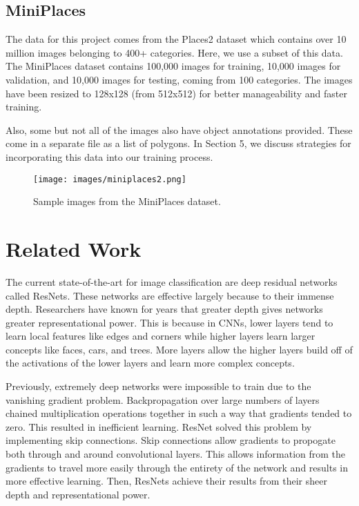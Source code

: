 \documentclass[10pt,twocolumn,letterpaper]{article}
\begin{document}
\subsection{MiniPlaces}

The data for this project comes from the Places2\cite{places} dataset which contains over 10 million images belonging to 400+ categories. Here, we use a subset of this data. The MiniPlaces dataset contains 100,000 images for training, 10,000 images for validation, and 10,000 images for testing, coming from 100 categories. The images have been resized to 128x128 (from 512x512) for better manageability and faster training. 

Also, some but not all of the images also have object annotations provided. These come in a separate file as a list of polygons. In Section 5, we discuss strategies for incorporating this data into our training process.

\begin{figure}[t]
\begin{center}
\texttt{[image: images/miniplaces2.png]}
\end{center}
   \caption{Sample images from the MiniPlaces dataset.}
\label{fig:long}
\label{fig:onecol}
\end{figure}

\section{Related Work}

The current state-of-the-art for image classification are deep residual networks called ResNets. These networks are effective largely because to their immense depth. Researchers have known for years that greater depth gives networks greater representational power.
This is because in CNNs, lower layers tend to learn local features like edges and corners while higher layers learn larger concepts like faces, cars, and trees. More layers allow the higher layers build off of the activations of the lower layers and learn more complex concepts. 

Previously, extremely deep networks were impossible to train due to the vanishing gradient problem. Backpropagation over large numbers of layers chained multiplication operations together in such a way that gradients tended to zero. This resulted in inefficient learning. ResNet solved this problem by implementing skip connections. Skip connections allow gradients to propogate both through and around convolutional layers. This allows information from the gradients to travel more easily through the entirety of the network and results in more effective learning. Then, ResNets achieve their results from their sheer depth and representational power.
\end{document}
